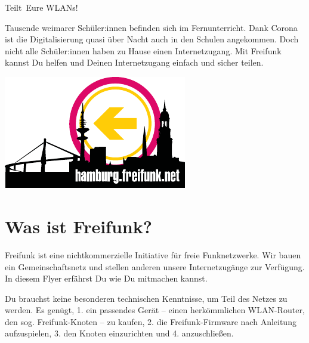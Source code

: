 \documentclass[10pt,a4paper,notumble]{leaflet}
\begin{document}


\begin{center}
{\fontsize{70}{90}\selectfont \faWifi}
\end{center}
\begin{center}
{\fontsize{30}{40}\selectfont Teilt\ Eure WLANs!}
\end{center}

\vfill

{\fontsize{16}{18}\selectfont Tausende weimarer Schüler:innen befinden sich im Fernunterricht. Dank Corona ist die Digitalisierung quasi über Nacht auch in den Schulen angekommen. Doch nicht alle Schüler:innen haben zu Hause einen Internetzugang. Mit Freifunk kannst Du helfen und Deinen Internetzugang einfach und sicher teilen.\par}

\vspace{4em}

\begin{center}
\includegraphics[width=80mm]{aufkleber_we.pdf}
\end{center}


\thispagestyle{empty}
\newpage

\section{Was ist Freifunk?}
Freifunk ist eine nichtkommerzielle Initiative für freie Funk\-netzwerke. Wir bauen ein Gemeinschaftsnetz und stellen anderen unsere Internetzugänge zur Verfügung. In diesem Flyer erfährst Du wie Du mitmachen kannst.

Du brauchst keine besonderen technischen Kenntnisse, um Teil des Netzes zu werden. Es genügt, 1. ein passendes Gerät -- einen herkömmlichen WLAN-Router, den sog. Freifunk-Knoten -- zu kaufen, 2. die Freifunk-Firmware nach Anleitung aufzuspielen, 3. den Knoten einzurichten und 4. anzuschließen.
\end{document}
